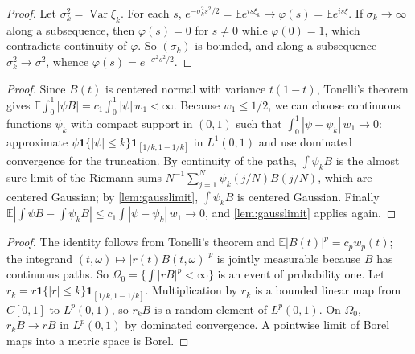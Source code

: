 \documentclass[11pt]{amsart}
\newtheorem{lemma}[theorem]{Lemma}
\theoremstyle{remark}
\newcommand{\R}{\mathbb{R}}
\newcommand{\E}{\mathbb{E}}
\newcommand{\ind}{\mathbf{1}}
\newcommand{\dd}{\,\mathrm{d}}
\newcommand{\Lp}{L^p(0,1)}
\begin{document}
\begin{proof}
Let $\sigma_k^2=\operatorname{Var}\xi_k$. For each $s$, $e^{-\sigma_k^2s^2/2}=\E e^{is\xi_k}\to\varphi(s)=\E e^{is\xi}$. If $\sigma_k\to\infty$ along a subsequence, then $\varphi(s)=0$ for $s\ne0$ while $\varphi(0)=1$, which contradicts continuity of $\varphi$. So $(\sigma_k)$ is bounded, and along a subsequence $\sigma_k^2\to\sigma^2$, whence $\varphi(s)=e^{-\sigma^2s^2/2}$.
\end{proof}


\begin{proof}
Since $B(t)$ is centered normal with variance $t(1-t)$, Tonelli's theorem gives $\E\int_0^1|\psi B|=c_1\int_0^1|\psi|\,w_1<\infty$. Because $w_1\le1/2$, we can choose continuous functions $\psi_k$ with compact support in $(0,1)$ such that $\int_0^1|\psi-\psi_k|\,w_1\to0$: approximate $\psi\ind\{|\psi|\le k\}\ind_{[1/k,1-1/k]}$ in $L^1(0,1)$ and use dominated convergence for the truncation. By continuity of the paths, $\int\psi_kB$ is the almost sure limit of the Riemann sums $N^{-1}\sum_{j=1}^{N}\psi_k(j/N)B(j/N)$, which are centered Gaussian; by \cref{lem:gausslimit}, $\int\psi_kB$ is centered Gaussian. Finally $\E|\int\psi B-\int\psi_kB|\le c_1\int|\psi-\psi_k|\,w_1\to0$, and \cref{lem:gausslimit} applies again.
\end{proof}


\begin{proof}
The identity follows from Tonelli's theorem and $\E|B(t)|^p=c_pw_p(t)$; the integrand $(t,\omega)\mapsto|r(t)B(t,\omega)|^p$ is jointly measurable because $B$ has continuous paths. So $\Omega_0=\{\int|rB|^p<\infty\}$ is an event of probability one. Let $r_k=r\ind\{|r|\le k\}\ind_{[1/k,1-1/k]}$. Multiplication by $r_k$ is a bounded linear map from $C[0,1]$ to $\Lp$, so $r_kB$ is a random element of $\Lp$. On $\Omega_0$, $r_kB\to rB$ in $\Lp$ by dominated convergence. A pointwise limit of Borel maps into a metric space is Borel.
\end{proof}
\end{document}
